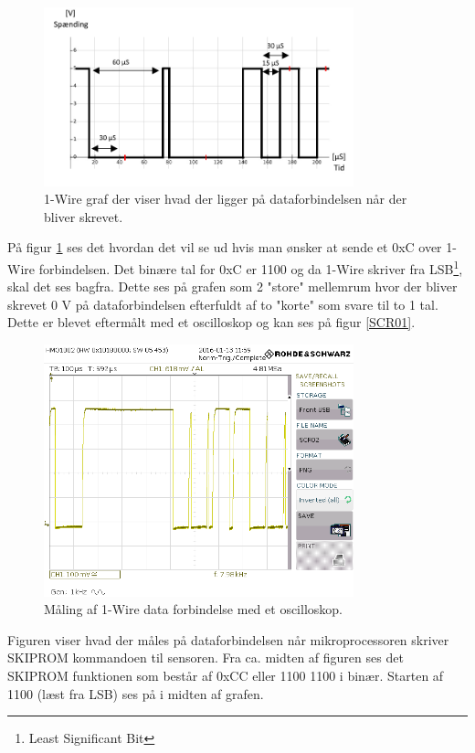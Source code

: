 \begin{figure}[h!]
  \centering
  \includegraphics[width=0.8\textwidth]{figures/onewire.png}
  \caption{1-Wire graf der viser hvad der ligger på dataforbindelsen når der bliver skrevet.}
  \label{onewire_graph}
\end{figure}

På figur \ref{onewire_graph} ses det hvordan det vil se ud hvis man ønsker at sende et 0xC over 1-Wire forbindelsen. Det binære tal for 0xC er 1100 og da 1-Wire skriver fra LSB\footnote{Least Significant Bit}, skal det ses bagfra. Dette ses på grafen som 2 "store" mellemrum hvor der bliver skrevet 0 V på dataforbindelsen efterfuldt af to "korte" som svare til to 1 tal. Dette er blevet eftermålt med et oscilloskop og kan ses på figur \ref{SCR01}.


\begin{figure}[h!]
  \centering
  \includegraphics[width=0.8\textwidth]{figures/SCR02.png}
  \caption{Måling af 1-Wire data forbindelse med et oscilloskop.}
  \label{SCR02}
\end{figure}

Figuren viser hvad der måles på dataforbindelsen når mikroprocessoren skriver SKIPROM kommandoen til sensoren.
Fra ca. midten af figuren ses det SKIPROM funktionen som består af 0xCC eller 1100 1100 i binær. Starten af 1100 (læst fra LSB) ses på i midten af grafen.